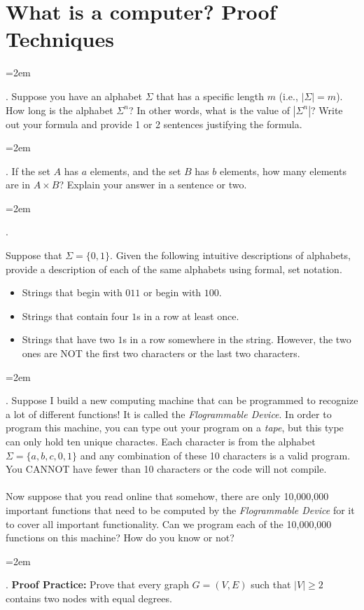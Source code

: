 \documentclass[12pt]{article}
\def\homework{What is a computer? Proof Techniques}
\newcounter{quesnum}
\newcommand{\question}[2][??]{
\begin{list}{\labelitemi}{\leftmargin=2em}
\item [\arabic{quesnum}.] {} {#2}
\end{list}
\addtocounter{quesnum}{1}
}
\begin{document}
\section*{\homework}


\question[3]{
Suppose you have an alphabet $\Sigma$ that has a specific length $m$ (i.e., $|\Sigma|=m$). How long is the alphabet $\Sigma^n$? In other words, what is the value of $|\Sigma^n|$? Write out your formula and provide 1 or 2 sentences justifying the formula.
}

\vspace{12pt}

\question[3]{
If the set $A$ has $a$ elements, and the set $B$ has $b$ elements, how many elements are in $A \times B$? Explain your answer in a sentence or two.
}

\vspace{12pt}

\question[3]{
Suppose that $\Sigma = \{0,1\}$. Given the following intuitive descriptions of alphabets, provide a description of each of the same alphabets using formal, set notation.

\begin{itemize}
	\item Strings that begin with $011$ or begin with $100$.
	\item Strings that contain four $1$s in a row at least once.
	\item Strings that have two $1$s in a row somewhere in the string. However, the two ones are NOT the first two characters or the last two characters.
\end{itemize}
}


\question[3]{
Suppose I build a new computing machine that can be programmed to recognize a lot of different functions! It is called the \emph{Flogrammable Device}. In order to program this machine, you can type out your program on a \emph{tape}, but this type can only hold ten unique charactes. Each character is from the alphabet $\Sigma=\{a,b,c,0,1\}$ and any combination of these 10 characters is a valid program. You CANNOT have fewer than 10 characters or the code will not compile.\\
\\
Now suppose that you read online that somehow, there are only 10,000,000 important functions that need to be computed by the \emph{Flogrammable Device} for it to cover all important functionality. Can we program each of the 10,000,000 functions on this machine? How do you know or not?
}

\vspace{12pt}

\question[3]{
\textbf{Proof Practice:} Prove that every graph $G = (V,E)$ such that $|V| \geq 2$ contains two nodes with equal degrees.
}
\end{document}

